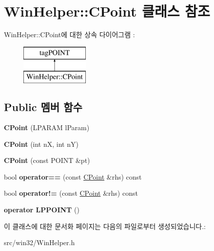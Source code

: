 \hypertarget{class_win_helper_1_1_c_point}{}\section{Win\+Helper\+:\+:C\+Point 클래스 참조}
\label{class_win_helper_1_1_c_point}
Win\+Helper\+:\+:C\+Point에 대한 상속 다이어그램 \+: \begin{figure}[H]
\begin{center}
\leavevmode
\includegraphics[height=2.000000cm]{class_win_helper_1_1_c_point}
\end{center}
\end{figure}
\subsection*{Public 멤버 함수}
\begin{DoxyCompactItemize}
\item 
\mbox{\label{class_win_helper_1_1_c_point_a1c07b1e078177dbd626443830d1bd8c8}} 
{\bfseries C\+Point} (L\+P\+A\+R\+AM l\+Param)
\item 
\mbox{\label{class_win_helper_1_1_c_point_af80910f72f637b0cbbe5f45cdf692d70}} 
{\bfseries C\+Point} (int nX, int nY)
\item 
\mbox{\label{class_win_helper_1_1_c_point_a24a90efac3a1cb2e699ea7cfa6f85bf6}} 
{\bfseries C\+Point} (const P\+O\+I\+NT \&pt)
\item 
\mbox{\label{class_win_helper_1_1_c_point_aad210b7d4619dad03142acdd689f4e46}} 
bool {\bfseries operator==} (const \mbox{\hyperlink{class_win_helper_1_1_c_point}{C\+Point}} \&rhs) const
\item 
\mbox{\label{class_win_helper_1_1_c_point_a54c819ee7db3549434ac6e5cc8c6b103}} 
bool {\bfseries operator!=} (const \mbox{\hyperlink{class_win_helper_1_1_c_point}{C\+Point}} \&rhs) const
\item 
\mbox{\label{class_win_helper_1_1_c_point_a3aa8bdc5ec8ff66c3492bc39c2a3e6a1}} 
{\bfseries operator L\+P\+P\+O\+I\+NT} ()
\end{DoxyCompactItemize}


이 클래스에 대한 문서화 페이지는 다음의 파일로부터 생성되었습니다.\+:\begin{DoxyCompactItemize}
\item 
src/win32/Win\+Helper.\+h\end{DoxyCompactItemize}
